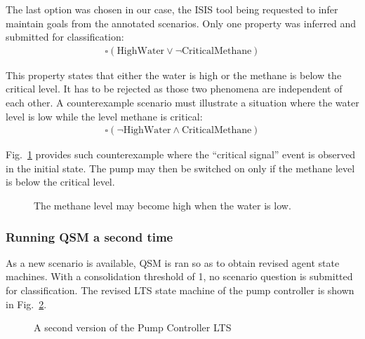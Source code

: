 The last option was chosen in our case, the ISIS tool being requested to infer maintain goals from the annotated scenarios. Only one property was inferred and submitted for classification:
\begin{align*}
\square(\mbox{HighWater} \vee \neg \mbox{CriticalMethane})
\end{align*}

This property states that either the water is high or the methane is below the critical level. It has to be rejected as those two phenomena are independent of each other. A counterexample scenario must illustrate a situation where the water level is low while the level methane is critical:
\begin{align*}
\square(\neg \mbox{HighWater} \wedge \mbox{CriticalMethane})
\end{align*}

Fig.~\ref{image:minepump-scenario-3} provides such counterexample where the ``critical signal'' event is observed in the initial state. The pump may then be switched on only if the methane level is below the critical level.

\begin{figure}
\centering
{}
\caption{The methane level may become high when the water is low.\label{image:minepump-scenario-3}}
\end{figure}

\subsubsection*{Running QSM a second time}

As a new scenario is available, QSM is ran so as to obtain revised agent state machines. With a consolidation threshold of 1, no scenario question is submitted for classification. The revised LTS state machine of the pump controller is shown in Fig.~\ref{image:minepump-controller-2-annotated}.
\begin{figure}
\centering
{}
\caption{A second version of the Pump Controller LTS\label{image:minepump-controller-2-annotated}}
\end{figure}

